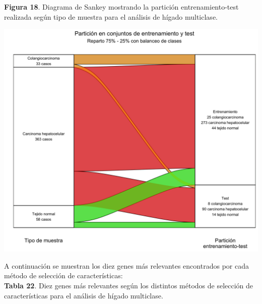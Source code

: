 \textbf{Figura 18}. Diagrama de Sankey mostrando la partición entrenamiento-test realizada según tipo de muestra para el análisis de hígado multiclase.
\begin{center}
	\includegraphics[width=1\textwidth]{figuras/18_higado_multiclase_05_sankey.png}
\end{center}

A continuación se muestran los diez genes más relevantes encontrados por cada método de selección de características:\\

\textbf{Tabla 22}. Diez genes más relevantes según los distintos métodos de selección de características para el análisis de hígado multiclase.

